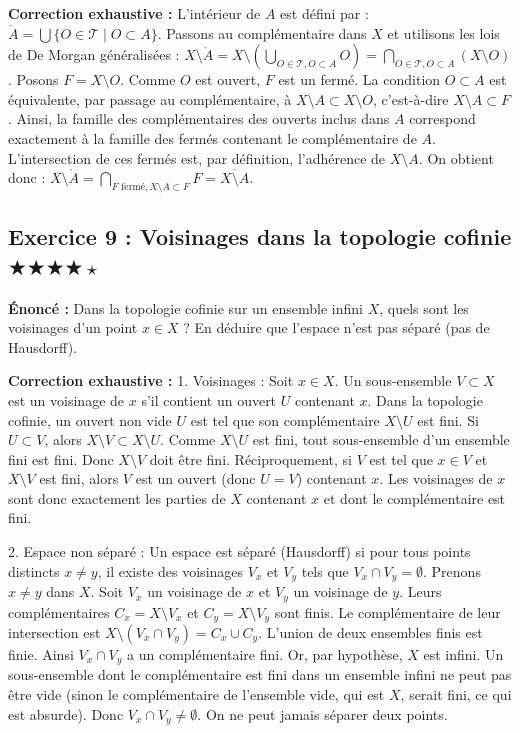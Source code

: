 \documentclass[11pt,a4paper]{article}
\begin{document}
\textbf{Correction exhaustive :}
L'intérieur de $A$ est défini par :
$\mathring{A} = \bigcup \{O \in \mathcal{T} \mid O \subset A\}$.
Passons au complémentaire dans $X$ et utilisons les lois de De Morgan généralisées :
$X \setminus \mathring{A} = X \setminus \left( \bigcup_{O \in \mathcal{T}, O \subset A} O \right) = \bigcap_{O \in \mathcal{T}, O \subset A} (X \setminus O)$.
Posons $F = X \setminus O$. Comme $O$ est ouvert, $F$ est un fermé.
La condition $O \subset A$ est équivalente, par passage au complémentaire, à $X \setminus A \subset X \setminus O$, c'est-à-dire $X \setminus A \subset F$.
Ainsi, la famille des complémentaires des ouverts inclus dans $A$ correspond exactement à la famille des fermés contenant le complémentaire de $A$.
L'intersection de ces fermés est, par définition, l'adhérence de $X \setminus A$.
On obtient donc : $X \setminus \mathring{A} = \bigcap_{F \text{ ferm\'{e}}, X \setminus A \subset F} F = \overline{X \setminus A}$.
\subsection*{Exercice 9 : Voisinages dans la topologie cofinie \quad $\bigstar\bigstar\bigstar\bigstar\star$}
\textbf{Énoncé :}
Dans la topologie cofinie sur un ensemble infini $X$, quels sont les voisinages d'un point $x \in X$ ? En déduire que l'espace n'est pas séparé (pas de Hausdorff).

\textbf{Correction exhaustive :}
1. Voisinages :
Soit $x \in X$. Un sous-ensemble $V \subset X$ est un voisinage de $x$ s'il contient un ouvert $U$ contenant $x$.
Dans la topologie cofinie, un ouvert non vide $U$ est tel que son complémentaire $X \setminus U$ est fini.
Si $U \subset V$, alors $X \setminus V \subset X \setminus U$. Comme $X \setminus U$ est fini, tout sous-ensemble d'un ensemble fini est fini. Donc $X \setminus V$ doit être fini.
Réciproquement, si $V$ est tel que $x \in V$ et $X \setminus V$ est fini, alors $V$ est un ouvert (donc $U=V$) contenant $x$.
Les voisinages de $x$ sont donc exactement les parties de $X$ contenant $x$ et dont le complémentaire est fini.

2. Espace non séparé :
Un espace est séparé (Hausdorff) si pour tous points distincts $x \neq y$, il existe des voisinages $V_x$ et $V_y$ tels que $V_x \cap V_y = \emptyset$.
Prenons $x \neq y$ dans $X$. Soit $V_x$ un voisinage de $x$ et $V_y$ un voisinage de $y$.
Leurs complémentaires $C_x = X \setminus V_x$ et $C_y = X \setminus V_y$ sont finis.
Le complémentaire de leur intersection est $X \setminus (V_x \cap V_y) = C_x \cup C_y$.
L'union de deux ensembles finis est finie. Ainsi $V_x \cap V_y$ a un complémentaire fini.
Or, par hypothèse, $X$ est infini. Un sous-ensemble dont le complémentaire est fini dans un ensemble infini ne peut pas être vide (sinon le complémentaire de l'ensemble vide, qui est $X$, serait fini, ce qui est absurde).
Donc $V_x \cap V_y \neq \emptyset$. On ne peut jamais séparer deux points.
\end{document}
